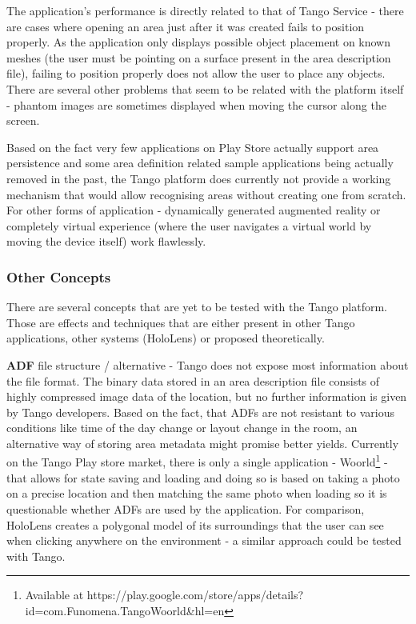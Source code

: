 \documentclass[12pt, a4paper]{article}
\begin{document}
The application’s performance is directly related to that of Tango Service - there are cases where opening an area just after it was created fails to position properly. As the application only displays possible object placement on known meshes (the user must be pointing on a surface present in the area description file), failing to position properly does not allow the user to place any objects. There are several other problems that seem to be related with the platform itself - phantom images are sometimes displayed when moving the cursor along the screen.

Based on the fact very few applications on Play Store actually support area persistence and some area definition related sample applications being actually removed in the past, the Tango platform does currently not provide a working mechanism that would allow recognising areas without creating one from scratch. For other forms of application - dynamically generated augmented reality or completely virtual experience (where the user navigates a virtual world by moving the device itself) work flawlessly.

\subsubsection{Other Concepts}
There are several concepts that are yet to be tested with the Tango platform. Those are effects and techniques that are either present in other Tango applications, other systems (HoloLens) or proposed theoretically.

\textbf{ADF} file structure / alternative - Tango does not expose most information about the file format. The binary data stored in an area description file consists of highly compressed image data of the location, but no further information is given by Tango developers. Based on the fact, that ADFs are not resistant to various conditions like time of the day change or layout change in the room, an alternative way of storing area metadata might promise better yields. Currently on the Tango Play store market, there is only a single application - Woorld\footnote{Available at https://play.google.com/store/apps/details?id=com.Funomena.TangoWoorld\&hl=en} - that allows for state saving and loading and doing so is based on taking a photo on a precise location and then matching the same photo when loading so it is questionable whether ADFs are used by the application. For comparison, HoloLens creates a polygonal model of its surroundings that the user can see when clicking anywhere on the environment - a similar approach could be tested with Tango.
\end{document}

